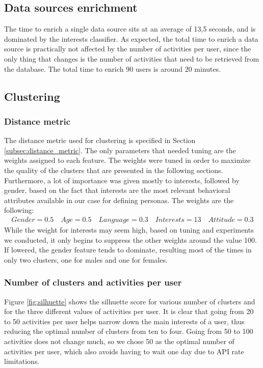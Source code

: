 \subsection{Data sources enrichment}
The time to enrich a single data source sits at an average of 13,5 seconds, and is dominated by the interests classifier. As expected, the total time to enrich a data source is practically not affected by the number of activities per user, since the only thing that changes is the number of activities that need to be retrieved from the database. The total time to enrich 90 users is around 20 minutes.

\subsection{Clustering}
\subsubsection{Distance metric}
The distance metric used for clustering is specified in Section \ref{subsec:distance_metric}. The only parameters that needed tuning are the weights assigned to each feature. The weights were tuned in order to maximize the quality of the clusters that are presented in the following sections. Furthermore, a lot of importance was given mostly to interests, followed by gender, based on the fact that interests are the most relevant behavioral attributes available in our case for defining personas. The weights are the following:
\begin{gather*}
    Gender = 0.5 \quad Age = 0.5 \quad Language = 0.3 \quad Interests = 13 \quad Attitude = 0.3
\end{gather*}
While the weight for interests may seem high, based on tuning and experiments we conducted, it only begins to suppress the other weights around the value 100. If lowered, the gender feature tends to dominate, resulting most of the times in only two clusters, one for males and one for females.

\subsubsection{Number of clusters and activities per user}
Figure \ref{fig:silhuette} shows the silhuette score for various number of clusters and for the three different values of activities per user. It is clear that going from 20 to 50 activities per user helps narrow down the main interests of a user, thus reducing the optimal number of clusters from ten to four. Going from 50 to 100 activities does not change much, so we chose 50 as the optimal number of activities per user, which also avoids having to wait one day due to API rate limitations.

